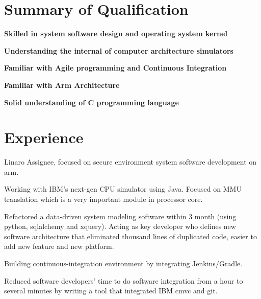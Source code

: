 \documentclass[letterpaper]{deedy-resume} %
\begin{document}
%
\begin{minipage}[t]{0.66\textwidth} %

\section{Summary of Qualification} 
\vspace{\topsep} %
\begin{tightitemize}
\item \bf Skilled in system software design and operating system kernel
\item \bf Understanding the internal of computer architecture simulators
\item \bf Familiar with Agile programming and Continuous Integration
\item \bf Familiar with Arm Architecture
\item \bf Solid understanding of C programming language
\end{tightitemize}

\section{Experience}


\vspace{\topsep} %
\begin{tightitemize}
\item Linaro Assignee, focused on secure environment system software development on arm.
\end{tightitemize}

\sectionspace %



\begin{tightitemize}
\item Working with IBM’s next-gen CPU simulator using Java. Focused on MMU translation which is a very important module in processor core.
\item Refactored a data-driven system modeling software within 3 month (using python, sqlalchemy and xquery). Acting as key developer who defines new software architecture that eliminated thousand lines of duplicated code, easier to add new feature and new platform.
\item Building continuous-integration environment by integrating Jenkins/Gradle.
\item Reduced software developers’ time to do software integration from a hour to several minutes by writing a tool that integrated IBM cmvc and git.
\end{tightitemize}


\end{minipage}
\end{document}
